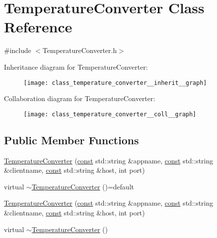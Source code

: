 \hypertarget{class_temperature_converter}{}\section{Temperature\+Converter Class Reference}
\label{class_temperature_converter}


{\ttfamily \#include $<$Temperature\+Converter.\+h$>$}



Inheritance diagram for Temperature\+Converter\+:
\nopagebreak
\begin{figure}[H]
\begin{center}
\leavevmode
\texttt{[image: class\_temperature\_converter\_\_inherit\_\_graph]}
\end{center}
\end{figure}


Collaboration diagram for Temperature\+Converter\+:
\nopagebreak
\begin{figure}[H]
\begin{center}
\leavevmode
\texttt{[image: class\_temperature\_converter\_\_coll\_\_graph]}
\end{center}
\end{figure}
\subsection*{Public Member Functions}
\begin{DoxyCompactItemize}
\item 
\hyperlink{class_temperature_converter_ad34b42abb624d7d4184f6e47dc1ad200}{Temperature\+Converter} (\hyperlink{functions__c_8js_afacfd9c985d225bb07483b887a801b6f}{const} std\+::string \&appname, \hyperlink{functions__c_8js_afacfd9c985d225bb07483b887a801b6f}{const} std\+::string \&clientname, \hyperlink{functions__c_8js_afacfd9c985d225bb07483b887a801b6f}{const} std\+::string \&host, int port)
\item 
virtual \hyperlink{class_temperature_converter_a60e728c5cd240024de4c010e92be8dda}{$\sim$\+Temperature\+Converter} ()=default
\item 
\hyperlink{class_temperature_converter_ad34b42abb624d7d4184f6e47dc1ad200}{Temperature\+Converter} (\hyperlink{functions__c_8js_afacfd9c985d225bb07483b887a801b6f}{const} std\+::string \&appname, \hyperlink{functions__c_8js_afacfd9c985d225bb07483b887a801b6f}{const} std\+::string \&clientname, \hyperlink{functions__c_8js_afacfd9c985d225bb07483b887a801b6f}{const} std\+::string \&host, int port)
\item 
virtual \hyperlink{class_temperature_converter_a4450d027b1c5041e33b4dffb30efb9f1}{$\sim$\+Temperature\+Converter} ()
\end{DoxyCompactItemize}
